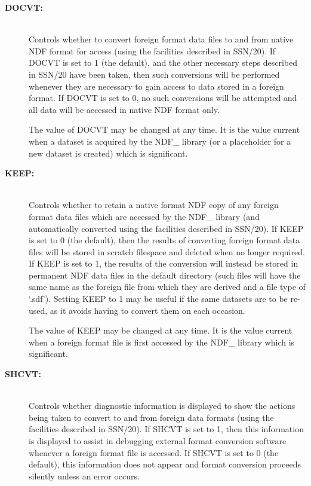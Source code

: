 \documentclass[twoside,11pt]{article}
\newcommand{\htmlref}[2]{#1}
\newcommand{\xref}[3]{#1}
\begin{document}
\begin{description}

\item[{\bf DOCVT:}]\mbox{}\\
Controls whether to convert foreign format data files to and from
native NDF format for access (using the facilities described in
\xref{SSN/20}{ssn20}{}). If DOCVT is set to 1 (the default), and the
other necessary steps described in SSN/20 have been taken, then such
conversions will be performed whenever they are necessary to gain
access to data stored in a foreign format. If DOCVT is set to 0, no
such conversions will be attempted and all data will be accessed in
native NDF format only.

The value of DOCVT may be changed at any time. It is the value current
when a dataset is acquired by the NDF\_ library (or a
\htmlref{placeholder}{ss:placeholders} for a new dataset is created)
which is significant.

\item[{\bf KEEP:}]\mbox{}\\
Controls whether to retain a native format NDF copy of any foreign
format data files which are accessed by the NDF\_ library (and
automatically converted using the facilities described in
\xref{SSN/20}{ssn20}{}). If
KEEP is set to 0 (the default), then the results of converting foreign
format data files will be stored in scratch filespace and deleted when
no longer required. If KEEP is set to 1, the results of the conversion
will instead be stored in permanent NDF data files in the default
directory (such files will have the same name as the foreign file from
which they are derived and a file type of `.sdf'). Setting
KEEP to 1 may be useful if the same datasets are to be re-used, as it
avoids having to convert them on each occasion.

The value of KEEP may be changed at any time. It is the value current
when a foreign format file is first accessed by the NDF\_ library
which is significant.

\item[{\bf SHCVT:}]\mbox{}\\
Controls whether diagnostic information is displayed to show the
actions being taken to convert to and from foreign data formats (using
the facilities described in \xref{SSN/20}{ssn20}{}). If SHCVT is set
to 1, then this
information is displayed to assist in debugging external format
conversion software whenever a foreign format file is accessed. If
SHCVT is set to 0 (the default), this information does not appear and
format conversion proceeds silently unless an error occurs.


\end{description}
\end{document}
